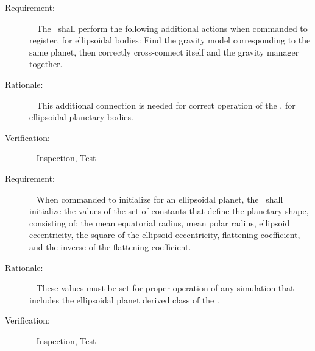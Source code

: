 \label{reqt:func_ellip_register_model}
\begin{description}
  \item[Requirement:]\ \newline
    The \planetDesc\ shall perform the following additional actions
    when commanded to register, for ellipsoidal bodies:
    Find the gravity model corresponding to the same planet, then 
    correctly cross-connect itself and the gravity manager together.

  \item[Rationale:]\ \newline
    This additional connection is needed for correct operation of the
    \planetDesc, for ellipsoidal planetary bodies.

  \item[Verification:]\ \newline
    Inspection, Test
\end{description}

\label{reqt:func_init_ellip_constants}
\begin{description}
  \item[Requirement:]\ \newline
    When commanded to initialize for an ellipsoidal planet, the \planetDesc\
    shall initialize the values of the set of constants that define the
    planetary shape, consisting of: the mean equatorial radius, mean polar
    radius, ellipsoid eccentricity, the square of the ellipsoid eccentricity,
    flattening coefficient, and the inverse of the flattening coefficient.
  \item[Rationale:]\ \newline
    These values must be set for proper operation of any simulation 
    that includes the ellipsoidal planet derived class of the \planetDesc.

  \item[Verification:]\ \newline
    Inspection, Test
\end{description}

%
%      
%   
%
%



